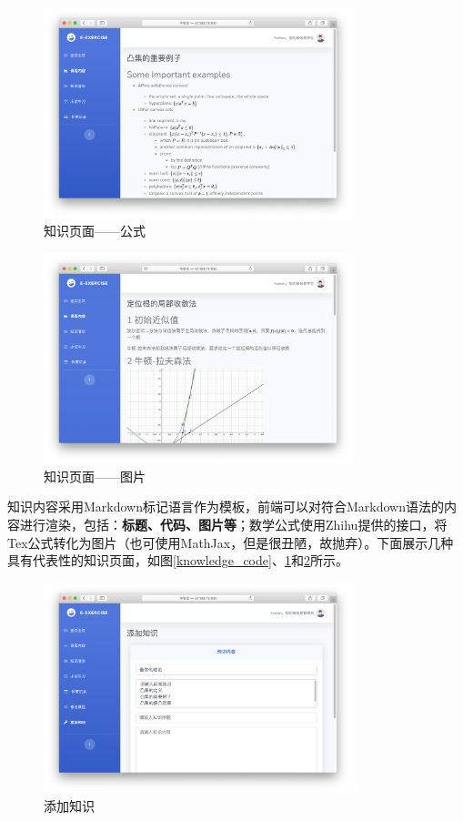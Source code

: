 \documentclass{nwafucoursepaper}
\begin{document}
\begin{figure}[htp]
  \centering
  \includegraphics[width=0.8\textwidth]{knowledge_math.png}
  \caption{知识页面——公式}
  \label{knowledge_math}
\end{figure}

\begin{figure}[htp]
  \centering
  \includegraphics[width=0.8\textwidth]{knowledge_image.png}
  \caption{知识页面——图片}
  \label{knowledge_image}
\end{figure}

知识内容采用Markdown标记语言作为模板，前端可以对符合Markdown语法的内容进行渲染，包括：\textbf{标题、代码、图片等}；数学公式使用Zhihu提供的接口，将Tex公式转化为图片（也可使用MathJax，但是很丑陋，故抛弃）。下面展示几种具有代表性的知识页面，如图\ref{knowledge_code}、\ref{knowledge_math}和\ref{knowledge_image}所示。

\begin{figure}[htp]
  \centering
  \includegraphics[width=0.8\textwidth]{add_knowledge.png}
  \caption{添加知识}
  \label{add_knowledge}
\end{figure}
\end{document}
